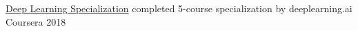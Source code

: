 

\begin{cvhonors}


  \cvhonor
    {\href{https://www.coursera.org/account/accomplishments/specialization/7HYKL994GYY6}{Deep Learning Specialization}} %
    {completed 5-course specialization by deeplearning.ai} %
    {Coursera} %
    {2018} %

\end{cvhonors}
